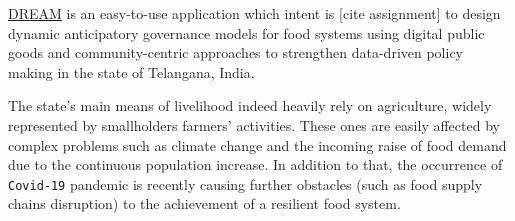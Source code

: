 

\hyperref[tab:acronymsTable]{DREAM} is an easy-to-use application which intent is [cite assignment] to design dynamic anticipatory governance models for food systems using digital public goods and community-centric approaches to strengthen data-driven policy making in the state of Telangana, India.

The state's main means of livelihood indeed heavily rely on agriculture, widely represented by smallholders farmers' activities. These ones are easily affected by complex problems such as climate change and the incoming raise of food demand due to the continuous population increase. In addition to that, the occurrence of \texttt{Covid-19} pandemic is recently causing further obstacles (such as food supply chains disruption) to the achievement of a resilient food system.


